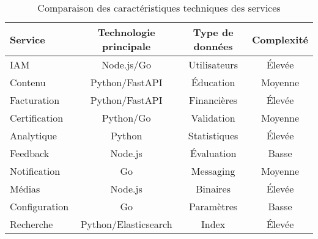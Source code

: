 \begin{table}[h!]
\centering
\small
\caption{Comparaison des caractéristiques techniques des services}
\label{tab:comparaison_services}
\begin{tabular}{|l|c|c|c|}
\hline
\textbf{Service} & \textbf{Technologie principale} & \textbf{Type de données} & \textbf{Complexité} \\
\hline
IAM & Node.js/Go & Utilisateurs & Élevée \\
Contenu & Python/FastAPI & Éducation & Moyenne \\
Facturation & Python/FastAPI & Financières & Élevée \\
Certification & Python/Go & Validation & Moyenne \\
Analytique & Python & Statistiques & Élevée \\
Feedback & Node.js & Évaluation & Basse \\
Notification & Go & Messaging & Moyenne \\
Médias & Node.js & Binaires & Élevée \\
Configuration & Go & Paramètres & Basse \\
Recherche & Python/Elasticsearch & Index & Élevée \\
\hline
\end{tabular}
\end{table}
\normalsize 